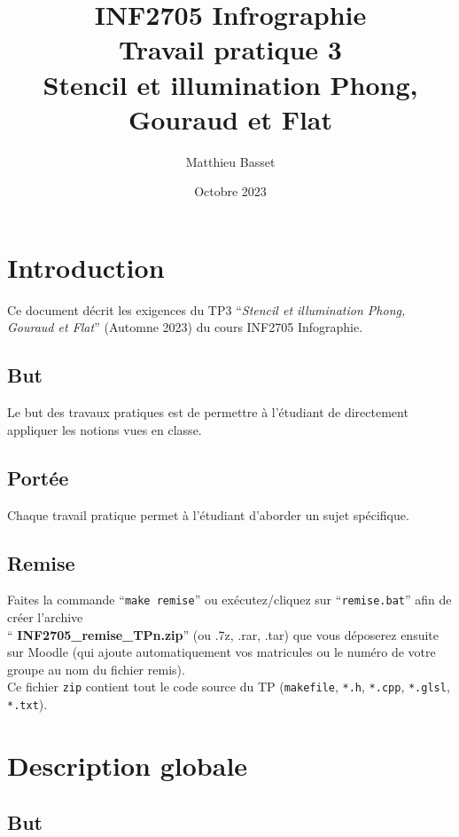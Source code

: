 \documentclass{article}[letterpaper, 11pt]
\title{INF2705 Infrographie\\
Travail pratique 3\\
Stencil et illumination Phong, Gouraud et
Flat}
\date{Octobre 2023}
\author{Matthieu Basset}
\renewcommand{\thepage}{}
\begin{document}
\thispagestyle{empty}
\maketitle
\newpage

\renewcommand{\thepage}{\arabic{page}}
\pagestyle{fancy}
\renewcommand{\contentsname}{Table des matières}
\setcounter{page}{1}
\tableofcontents


\newpage

\section{Introduction}
Ce document décrit les exigences du TP3 ``\textit{Stencil et illumination Phong, Gouraud et Flat}'' (Automne
2023) du cours INF2705 Infographie.
\subsection{But}
Le but des travaux pratiques est de permettre à l'étudiant de directement appliquer les notions vues
en classe.

\subsection{Portée}
Chaque travail pratique permet à l'étudiant d'aborder un sujet spécifique.

\subsection{Remise}
Faites la commande ``\texttt{make remise}'' ou exécutez/cliquez sur ``\texttt{remise.bat}'' afin de créer l'archive \\``\textbf{ INF2705\_remise\_TPn.zip}'' (ou .7z, .rar, .tar) que vous déposerez ensuite sur Moodle (qui ajoute automatiquement vos matricules ou le numéro de votre groupe au nom du fichier remis).\\
Ce fichier \texttt{zip} contient tout le code source du TP (\texttt{makefile}, \texttt{*.h}, \texttt{*.cpp}, \texttt{*.glsl}, \texttt{*.txt}).

\newpage
\section{Description globale}
\subsection{But}
\end{document}
